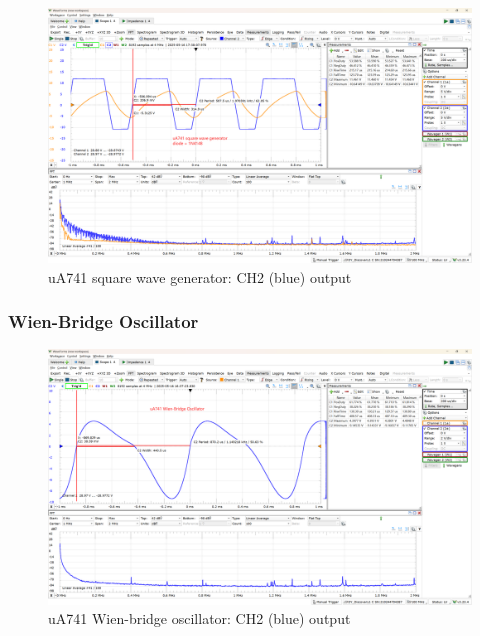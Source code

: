\documentclass[UTF8]{article}
\begin{document}
\begin{figure}[H]\centering
    \includegraphics[width=\columnwidth]{LCE-06-07-运放设计/assets/uA741/test/square.png}
    \caption{uA741 square wave generator: CH2 (blue) output}
\end{figure}

\subsubsection{Wien-Bridge Oscillator}

\begin{figure}[H]\centering
    \includegraphics[width=\columnwidth]{LCE-06-07-运放设计/assets/uA741/test/wien 1.png}
    \caption{uA741 Wien-bridge oscillator: CH2 (blue) output}
\end{figure}
\end{document}
